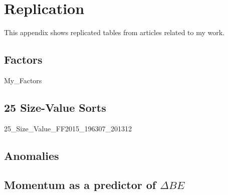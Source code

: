 
\section{Replication} \label{sec:repl}

This appendix shows replicated tables from articles related to my work.

\subsection{\textcite{fama2016dissecting, fama2016choosing} Factors} \label{sec:repl.FF2016}

{My_Factors}

\subsection{\textcite{fama2015five} 25 Size-Value Sorts}


{25_Size_Value_FF2015_196307_201312}


\subsection{\textcite{fama2016dissecting, fama2016choosing} Anomalies}

\subsection{\textcite{asness2013devil} Momentum as a predictor of $\Delta BE$}
